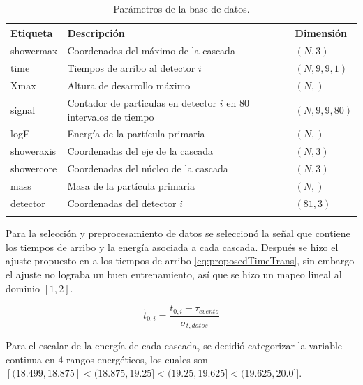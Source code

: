 \begin{table}
    \caption{Parámetros de la base de datos.}
    \label{tab:DBfeatures}
    \centering
    \begin{tabular}{l l l}
        \toprule
        \textbf{Etiqueta} & \textbf{Descripción} & \textbf{Dimensión} \\
        \midrule
        showermax & Coordenadas del máximo de la cascada & $(N,3)$\\
        time & Tiempos de arribo al detector $i$ & $(N,9,9,1)$\\
        Xmax & Altura de desarrollo máximo & $(N,)$\\
        signal & Contador de particulas en detector $i$ en $80$ intervalos de tiempo & $(N,9,9,80)$\\
        logE & Energía de la partícula primaria & $(N,)$\\
        showeraxis & Coordenadas del eje de la cascada & $(N,3)$\\
        showercore & Coordenadas del núcleo de la cascada & $(N,3)$\\
        mass & Masa de la partícula primaria & $(N,)$\\
        detector & Coordenadas del detector $i$ & $(81,3)$\\
        \bottomrule\\
    \end{tabular}
\end{table}

Para la selección y preprocesamiento de datos se seleccionó la señal que contiene los tiempos de arribo y la energía asociada a cada cascada. Después se hizo el ajuste propuesto en \parencite{Erdmann2018b} a los tiempos de arribo \ref{eq:proposedTimeTrans}, sin embargo el ajuste no lograba un buen entrenamiento, así que se hizo un mapeo lineal al dominio $[1,2]$.

\begin{equation}
    \label{eq:proposedTimeTrans}
    \tilde{t}_{0,i} = \frac{t_{0,i} - \tau_{evento}}{\sigma_{t,datos}}
\end{equation}


Para el escalar de la energía de cada cascada, se decidió categorizar la variable continua en $4$ rangos energéticos, los cuales son $[(18.499, 18.875] < (18.875, 19.25] < (19.25, 19.625] < (19.625, 20.0]]$.

